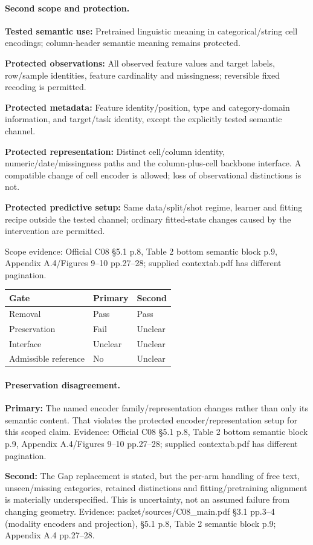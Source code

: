 \documentclass[10pt]{article}
\begin{document}
\paragraph{Second scope and protection.}
\textbf{Tested semantic use:} Pretrained linguistic meaning in categorical/string cell encodings; column-header semantic meaning remains protected.\par
\textbf{Protected observations:} All observed feature values and target labels, row/sample identities, feature cardinality and missingness; reversible fixed recoding is permitted.\par
\textbf{Protected metadata:} Feature identity/position, type and category-domain information, and target/task identity, except the explicitly tested semantic channel.\par
\textbf{Protected representation:} Distinct cell/column identity, numeric/date/missingness paths and the column-plus-cell backbone interface. A compatible change of cell encoder is allowed; loss of observational distinctions is not.\par
\textbf{Protected predictive setup:} Same data/split/shot regime, learner and fitting recipe outside the tested channel; ordinary fitted-state changes caused by the intervention are permitted.\par
Scope evidence: Official C08 §5.1 p.8, Table 2 bottom semantic block p.9, Appendix A.4/Figures 9--10 pp.27--28; supplied contextab.pdf has different pagination.\par
\begin{tabular}{lll}\toprule Gate & Primary & Second \\ \midrule
Removal & Pass & Pass \\
Preservation & Fail & Unclear \\
Interface & Unclear & Unclear \\
Admissible reference & No & Unclear \\
\bottomrule\end{tabular}
\paragraph{Preservation disagreement.}
\textbf{Primary:} The named encoder family/representation changes rather than only its semantic content. That violates the protected encoder/representation setup for this scoped claim. Evidence: Official C08 §5.1 p.8, Table 2 bottom semantic block p.9, Appendix A.4/Figures 9--10 pp.27--28; supplied contextab.pdf has different pagination.\par
\textbf{Second:} The Gap replacement is stated, but the per-arm handling of free text, unseen/missing categories, retained distinctions and fitting/pretraining alignment is materially underspecified. This is uncertainty, not an assumed failure from changing geometry. Evidence: packet/sources/C08\_main.pdf §3.1 pp.3--4 (modality encoders and projection), §5.1 p.8, Table 2 semantic block p.9; Appendix A.4 pp.27--28.\par
\end{document}
